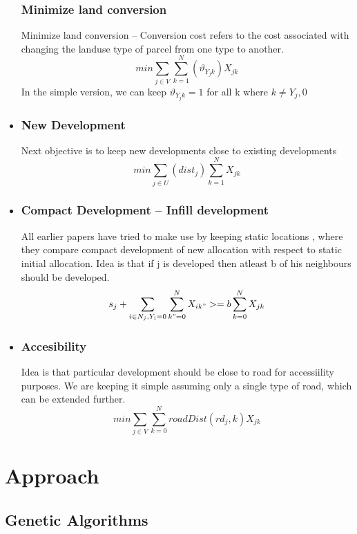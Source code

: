 \documentclass{sig-alternate}
\begin{document}
\begin{itemize}
\subsubsection*{Minimize land conversion }
Minimize land conversion -- Conversion cost refers to the cost associated with changing the landuse type of parcel from one type to another.
$$
 min\sum_{j \in V}  \sum_{k=1}^N (\vartheta_{Y_{j}k}) X_{jk}
 $$
In the simple version, we can keep $\vartheta_{Y_{j}k} =  1$ for all k where $k \neq Y_{j},0$
\item
\subsubsection*{ New Development}
Next objective is to keep new developments close to existing developments
 $$
 min\sum_{j \in U}(dist_j) \sum_{k=1}^N X_{jk}
 $$


\item
\subsubsection*{Compact Development -- Infill development}
All earlier papers have tried to make use by keeping static locations , where they compare compact development of new allocation with respect to static initial allocation.
Idea is that if j is developed then atleast b of his neighbours should be developed.
$$
s_j +\sum_{i \in N_j, Y_{i} =0 } \sum_{k"=0}^N X_{ik"} >= b \sum_{k=0}^N X_{jk}
 $$
\item
\subsubsection*{Accesibility  }
Idea is that particular development should be close to road for accessiility purposes. We are keeping it simple assuming only a single type of road, which can be extended further.
 $$
 min\sum_{j \in V} \sum_{k=0}^N roadDist(rd_j,k)X_{jk}
 $$



\end{itemize}

\section{Approach}

\subsection{Genetic Algorithms }
\end{document}
